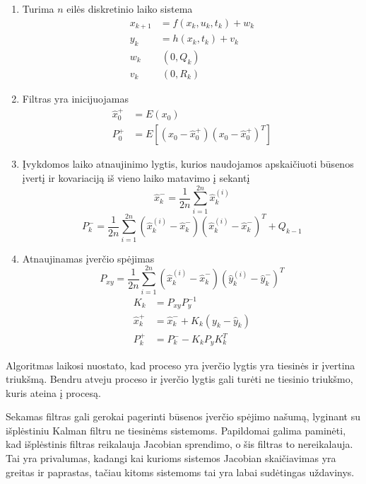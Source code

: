 \begin{enumerate}
    \item Turima $n$ eilės diskretinio laiko sistema
    \begin{equation}
        \begin{aligned}
            x_{k+1} &= f(x_k, u_k, t_k) + w_k \\
            y_k &= h(x_k, t_k) + v_k \\
            w_k &~ (0, Q_k) \\
            v_k &~ (0, R_k)
        \end{aligned}
    \end{equation}
    \item Filtras yra inicijuojamas
    \begin{equation}
        \begin{aligned}
            \hat{x}_0^+ &= E(x_0)\\
            P_0^+ &= E[ (x_0 - \hat{x}_0^+)(x_0 - \hat{x}_0^+)^T ]
        \end{aligned}
    \end{equation}
    \item Įvykdomos laiko atnaujinimo lygtis, kurios naudojamos apskaičiuoti būsenos įvertį ir kovariaciją iš vieno laiko matavimo į sekantį
    \begin{equation}
        \hat{x}_k^- = \frac{1}{2n} \sum_{i=1}^{2n} \hat{x}_k^{(i)}
    \end{equation}
    \begin{equation}
        P_k^- = \frac{1}{2n} \sum_{i=1}^{2n}( \hat{x}_k^{(i)} - \hat{x}_k^- )( \hat{x}_k^{(i)} - \hat{x}_k^- )^T + Q_{k-1}
    \end{equation}
    \item Atnaujinamas įverčio spėjimas
    \begin{equation}
        P_{xy} = \frac{1}{2n}\sum_{i=1}^{2n} (\hat{x}_k^{(i)} - \hat{x}_k^- )( \hat{y}_k^{(i)} - \hat{y}_k^- )^T
    \end{equation}
    \begin{equation}
        \begin{aligned}
            K_k &= P_{xy}P_y^{-1} \\
            \hat{x}_k^+ &= \hat{x}_k^- + K_k(y_k - \hat{y}_k) \\
            P_k^+ &= P_k^- - K_kP_yK_k^T
        \end{aligned}
    \end{equation}
\end{enumerate}

Algoritmas laikosi nuostato, kad proceso yra įverčio lygtis yra tiesinės ir įvertina triukšmą.
Bendru atveju proceso ir įverčio lygtis gali turėti ne tiesinio triukšmo, kuris ateina į procesą.

Sekamas filtras gali gerokai pagerinti būsenos įverčio spėjimo našumą, lyginant su išplėstiniu Kalman filtru ne tiesinėms sistemoms.
Papildomai galima paminėti, kad išplėstinis filtras reikalauja Jacobian sprendimo, o šis filtras to nereikalauja.
Tai yra privalumas, kadangi kai kurioms sistemos Jacobian skaičiavimas yra greitas ir paprastas, tačiau kitoms sistemoms tai yra labai sudėtingas uždavinys.
